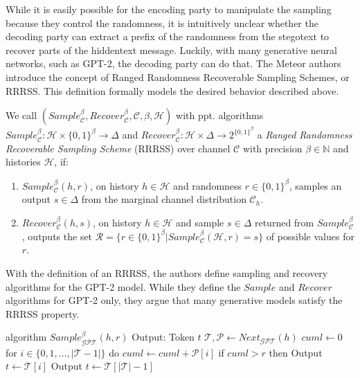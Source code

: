 While it is easily possible for the encoding party to manipulate the sampling because they control the randomness, it is intuitively unclear whether the decoding party can extract a prefix of the randomness from the stegotext to recover parts of the hiddentext message.
Luckily, with many generative neural networks, such as GPT-2, the decoding party can do that.
The Meteor authors introduce the concept of Ranged Randomness Recoverable Sampling Schemes, or RRRSS.
This definition formally models the desired behavior described above.
\begin{definition}
  \label{def:rrrss}
  We call 
  $(Sample_{\mathcal{C}}^\beta, Recover_{\mathcal{C}}^\beta, \mathcal{C}, \beta, \mathcal{H})$ 
  with ppt. algorithms
  $Sample_{\mathcal{C}}^\beta \colon \mathcal{H} \times \{0,1\}^\beta \rightarrow \Delta$ 
  and 
  $Recover_{\mathcal{C}}^\beta \colon \mathcal{H} \times \Delta \rightarrow 2^{\{0,1\}^\beta}$
  a \emph{Ranged Randomness Recoverable Sampling Scheme} (RRRSS) over channel $\mathcal{C}$ with precision $\beta \in \mathbb{N}$ and histories $\mathcal{H}$, if:
  
  \begin{enumerate}
    \item $Sample_{\mathcal{C}}^\beta(h, r)$, on history $h \in \mathcal{H}$ and randomness $r \in \{0,1\}^\beta$, samples an output $s \in \Delta$ from the marginal channel distribution $\mathcal{C}_h$.
    \item $Recover_{\mathcal{C}}^\beta(h, s)$, on history $h \in \mathcal{H}$ and sample $s \in \Delta$ returned from $Sample_{\mathcal{C}}^\beta$, outputs the set $\mathcal{R} = \{ r \in \{0,1\}^\beta | Sample_{\mathcal{C}}^\beta(\mathcal{H}, r) = s \}$ of possible values for $r$.
  \end{enumerate}
\end{definition}
With the definition of an RRRSS, the authors define sampling and recovery algorithms for the GPT-2 model.
While they define the $Sample$ and $Recover$ algorithms for GPT-2 only, they argue that many generative models satisfy the RRRSS property.

\begin{Pseudocode}[caption={
RRRSS $Sample$ algorithm for GPT-2 \cite{Meteor2021}.
$Sample$ produces, given a history $h$ and a value $r$, the next token sampled according to $r$ from the distribution generated by $\mathcal{C}_h = Next_{\mathcal{GPT}}(h)$.
}]
algorithm $Sample_{\mathcal{GPT}}^\beta(  h, r)$
  Output: Token $t$
  $\mathcal{T}, \mathcal{P} \leftarrow Next_{\mathcal{GPT}}(h)$
  $cuml \leftarrow 0$
  for $i \in \{ 0, 1, \dots, | \mathcal{T} - 1 | \}$ do
    $cuml \leftarrow cuml + \mathcal{P}[i]$
    if $cuml > r$ then
      Output $t \leftarrow \mathcal{T}[i]$
  Output $t \leftarrow \mathcal{T}[|\mathcal{T}|-1]$
\end{Pseudocode}

